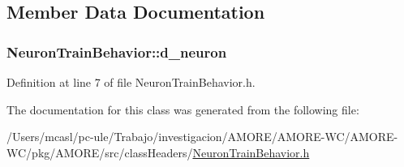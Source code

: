 \subsection{Member Data Documentation}
\hypertarget{class_neuron_train_behavior_a9c10df775cf7a1d0a62e6b66d9cf07cd}{
\subsubsection[{d\_\-neuron}]{ {\bf NeuronTrainBehavior::d\_\-neuron}}}
\label{class_neuron_train_behavior_a9c10df775cf7a1d0a62e6b66d9cf07cd}


Definition at line 7 of file NeuronTrainBehavior.h.



The documentation for this class was generated from the following file:\begin{DoxyCompactItemize}
\item 
/Users/mcasl/pc-\/ule/Trabajo/investigacion/AMORE/AMORE-\/WC/AMORE-\/WC/pkg/AMORE/src/classHeaders/\hyperlink{_neuron_train_behavior_8h}{NeuronTrainBehavior.h}\end{DoxyCompactItemize}
